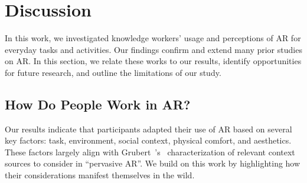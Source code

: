 \section{Discussion}
In this work, we investigated knowledge workers' usage and perceptions of AR for everyday tasks and activities.
Our findings confirm and extend many prior studies on AR. 
In this section, we relate these works to our results, identify opportunities for future research, and outline the limitations of our study.

\subsection{How Do People Work in AR?}

Our results indicate that participants adapted their use of AR based on several key factors: task, environment, social context, physical comfort, and aesthetics. 
These factors largely align with Grubert~\etal's~\cite{grubert2017pervasive} characterization of relevant context sources to consider in ``pervasive AR''.
We build on this work by highlighting how their considerations manifest themselves in the wild.

